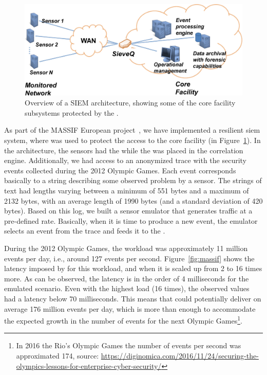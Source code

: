 \begin{figure}[!h]
\centering
\includegraphics[width=0.65\columnwidth]{images/images/SIEM.pdf}
\caption{Overview of a SIEM architecture, showing some of the core facility subsystems protected by the \sieveq.}
\label{fig:siem}
\end{figure}


As part of the MASSIF European project~\cite{Vianello:2013}, we have implemented a resilient \gls{siem} system, where \sieveq was used to protect the access to the core facility (in Figure~\ref{fig:siem}).
In the \sieveq architecture, the sensors had the \sender while the \postsieve was placed in the correlation engine.
Additionally, we had access to an anonymized trace with the security events collected during the 2012 Olympic Games.
Each event corresponds basically to a string describing some observed problem by a sensor. The strings of text had lengths varying between a minimum of 551 bytes and a maximum of 2132 bytes, with an average length of 1990 bytes (and a standard deviation of 420 bytes). Based on this log, we built a sensor emulator that generates traffic at a pre-defined rate. Basically, when it is time to produce a new event, the emulator selects an event from the trace and feeds it to the \sender.

During the 2012 Olympic Games, the workload was approximately 11 million events per day, i.e., around 127 events per second.
Figure~\ref{fig:massif} shows the latency imposed by \sieveq for this workload, and when it is scaled up from 2 to 16 times more. 
As can be observed, the latency is in the order of 4 milliseconds for the emulated scenario.
Even with the highest load (16 times), the observed values had a latency below $70$ milliseconds.
This means that \sieveq could potentially deliver on average 176 million events per day, which is more than enough to accommodate the expected growth in the number of events for the next Olympic Games\footnote{In 2016 the Rio's Olympic Games the number of events per second was approximated 174, source: \url{https://diginomica.com/2016/11/24/securing-the-olympics-lessons-for-enterprise-cyber-security/}}.

